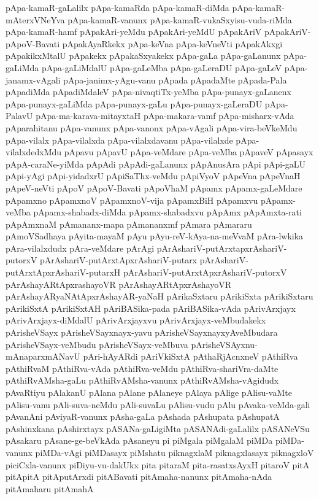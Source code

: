 {pApa-kamaR-gaLalilx
pApa-kamaRda
pApa-kamaR-diMda
pApa-kamaR-mAterxVNeYva
pApa-kamaR-vanunx
pApa-kamaR-vukaSxyisu-vuda-riMda
pApa-kamaR-hamf
pApakAri-yeMdu
pApakAri-yeMdU
pApakAriV
pApakAriV-pApoV-Bavati
pApakAyaRkekx
pApa-keVna
pApa-keVneVti
pApakAkxgi
pApakikxMtalU
pApakekx
pApakaSxyakekx
pApa-gaLa
pApa-gaLanunx
pApa-gaLiMda
pApa-gaLiMdalU
pApa-gaLeMba
pApa-gaLeraDU
pApa-gaLeV
pApa-janamx-vAgali
pApa-janimx-yAgu-vanu
pApada
pApadaMte
pApada-Pala
pApadiMda
pApadiMdaleV
pApa-nivaqtiTx-yeMba
pApa-punayx-gaLanenx
pApa-punayx-gaLiMda
pApa-punayx-gaLu
pApa-punayx-gaLeraDU
pApa-PalavU
pApa-ma-karava-mitayxtaH
pApa-makara-vamf
pApa-misharx-vAda
pAparahitanu
pApa-vanunx
pApa-vanonx
pApa-vAgali
pApa-vira-beVkeMdu
pApa-vilalx
pApa-vilalxda
pApa-vilalxdavanu
pApa-vilalxde
pApa-vilalxdedxMdu
pApavu
pApavU
pApa-veMdare
pApa-veMba
pApaveV
pApasayx
pApA-caraNe-yiMda
pApAdi
pApAdi-gaLanunx
pApAnusAra
pApi
pApi-gaLU
pApi-yAgi
pApi-yidadxrU
pApiSaThx-veMdu
pApiVyoV
pApeVna
pApeVnaH
pApeV-neVti
pApoV
pApoV-Bavati
pApoVhaM
pApamx
pApamx-gaLeMdare
pApamxno
pApamxnoV
pApamxnoV-vija
pApamxBiH
pApamxvu
pApamx-veMba
pApamx-shabadx-diMda
pApamx-shabadxvu
pApAmx
pApAmxta-rati
pApAmxnaM
pAmananx-mapa
pAmananxmf
pAmara
pAmararu
pAmoVSadhaya
pAyita-mayaM
pAyu
pAyu-reV-kAya-na-meVvaM
pAra-lwkika
pAra-vilalxdudx
pAra-veMdare
pArAgi
pArAshariV-putArxtapxrAshariV-putorxV
pArAshariV-putArxtApxrAshariV-putarx
pArAshariV-putArxtApxrAshariV-putarxH
pArAshariV-putArxtApxrAshariV-putorxV
pArAshayARtApxrashayoVR
pArAshayARtApxrAshayoVR
pArAshayARyaNAtApxrAshayAR-yaNaH
pArikaSxtaru
pArikiSxta
pArikiSxtaru
pArikiSxtA
pArikiSxtAH
pAriBASika-pada
pAriBASika-vAda
pArivArxjayx
pArivArxjayx-diMdalU
pArivArxjayxvu
pArivArxjayx-veMbudakekx
pArisheVSayx
pArisheVSayxnayx-yavu
pArisheVSayxnayxyAveMbudara
pArisheVSayx-veMbudu
pArisheVSayx-veMbuva
pArisheVSAyxnu-mAnaparxmANavU
pAri-hAyARdi
pAriVkiSxtA
pAthaRjAcnxneV
pAthiRva
pAthiRvaM
pAthiRva-vAda
pAthiRva-veMdu
pAthiRva-shariVra-daMte
pAthiRvAMsha-gaLu
pAthiRvAMsha-vanunx
pAthiRvAMsha-vAgidudx
pAvaRtiyu
pAlakanU
pAlana
pAlane
pAlaneye
pAlaya
pAlige
pAlisu-vaMte
pAlisu-vanu
pAli-suva-neMdu
pAli-suvaLu
pAlisu-vudu
pAlu
pAvaka-veMda-gali
pAvanAni
pAviyaR-vanunx
pAsha-gaLa
pAshada
pAshupata
pAshupatA
pAshinxkana
pAshirxtayx
pASANa-gaLigiMta
pASANAdi-gaLalilx
pASANeVSu
pAsakaru
pAsane-ge-beVkAda
pAsaneyu
pi
piMgala
piMgalaM
piMDa
piMDa-vanunx
piMDa-vAgi
piMDasayx
piMshatu
piknagxlaM
piknagxlasayx
piknagxloV
piciCxla-vanunx
piDiyu-vu-dakUkx
pita
pitaraM
pita-rasatxsAyxH
pitaroV
pitA
pitApitA
pitAputArxdi
pitABavati
pitAmaha-nanunx
pitAmaha-nAda
pitAmaharu
pitAmahA
}
